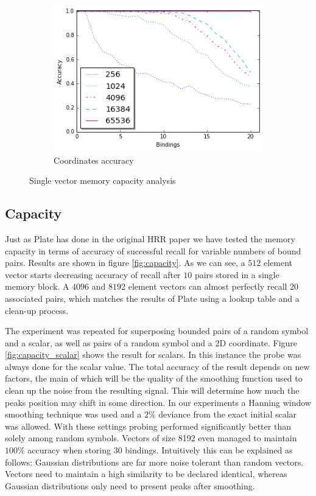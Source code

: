 \documentclass[a4paper,twoside]{article}
\begin{document}
\begin{figure}[th!]
\begin{subfigure}{0.45\columnwidth}
				\includegraphics[width=1\columnwidth]{img/capacity_coordinate.png}
				\caption{Coordinates accuracy}
				\label{fig:capacity_coordinate}
			\end{subfigure}	
			\caption{Single vector memory capacity analysis}
		\end{figure}	
	
	
	\subsection{Capacity}
	
	Just as Plate has done in the original HRR paper \cite{Plate:1995:HolographicReducedRepresentations} we have tested the memory capacity in terms of accuracy of successful recall for variable numbers of bound pairs. Results are shown in figure \ref{fig:capacity}. As we can see, a $512$ element vector starts decreasing accuracy of recall after $10$ pairs stored in a single memory block. A $4096$ and $8192$ element vectors can almost perfectly recall $20$ associated pairs, which matches the results of Plate using a lookup table and a clean-up process. 
	
	The experiment was repeated for superposing bounded pairs of a random symbol and a scalar, as well as pairs of a random symbol and a 2D coordinate. Figure \ref{fig:capacity_scalar} shows the result for scalars. In this instance the probe was always done for the scalar value. The total accuracy of the result depends on new factors, the main of which will be the quality of the smoothing function used to clean up the noise from the resulting signal. This will determine how much the peaks position may shift in some direction. In our experiments a Hanning window smoothing technique was used and a $2\%$ deviance from the exact initial scalar was allowed. With these settings probing performed significantly better than solely among random symbols. Vectors of size 8192 even managed to maintain $100\%$ accuracy when storing $30$ bindings. Intuitively this can be explained as follows: Gaussian distributions are far more noise tolerant than random vectors. Vectors need to maintain a high similarity to be declared identical, whereas Gaussian distributions only need to present peaks after smoothing. 
	
\end{document}
